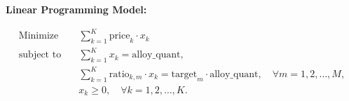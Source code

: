 \documentclass{article}
\begin{document}
\textbf{Linear Programming Model:}

\begin{align*}
\text{Minimize} \quad & \sum_{k=1}^{K} \text{price}_k \cdot x_k \\
\text{subject to} \quad & \sum_{k=1}^{K} x_k = \text{alloy\_quant}, \\
& \sum_{k=1}^{K} \text{ratio}_{k,m} \cdot x_k = \text{target}_m \cdot \text{alloy\_quant}, \quad \forall m = 1, 2, \ldots, M, \\
& x_k \geq 0, \quad \forall k = 1, 2, \ldots, K.
\end{align*}
\end{document}
